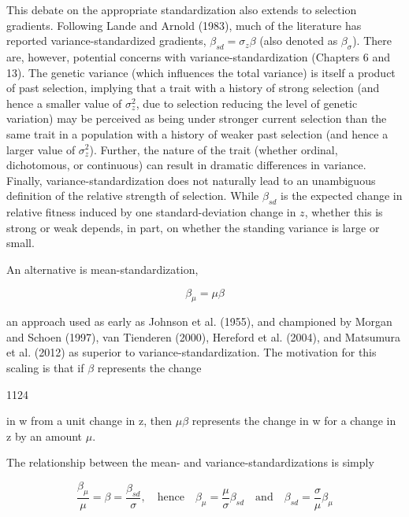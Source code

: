 \documentclass{article}
\begin{document}
This debate on the appropriate standardization also extends to selection gradients. Following Lande and Arnold (1983), much of the literature has reported variance-standardized gradients,  $ \beta_{sd} = \sigma_z \beta $ (also denoted as  $ \beta_\sigma $). There are, however, potential concerns with variance-standardization (Chapters 6 and 13). The genetic variance (which influences the total variance) is itself a product of past selection, implying that a trait with a history of strong selection (and hence a smaller value of  $ \sigma_z^2 $, due to selection reducing the level of genetic variation) may be perceived as being under stronger current selection than the same trait in a population with a history of weaker past selection (and hence a larger value of  $ \sigma_z^2 $). Further, the nature of the trait (whether ordinal, dichotomous, or continuous) can result in dramatic differences in variance. Finally, variance-standardization does not naturally lead to an unambiguous definition of the relative strength of selection. While  $ \beta_{sd} $ is the expected change in relative fitness induced by one standard-deviation change in  $ z $, whether this is strong or weak depends, in part, on whether the standing variance is large or small.

An alternative is mean-standardization,

\begin{equation}
\beta_{\mu}=\mu\beta
\tag{29.33a}
\label{eq:29_33a}
\end{equation}

an approach used as early as Johnson et al. (1955), and championed by Morgan and Schoen (1997), van Tienderen (2000), Hereford et al. (2004), and Matsumura et al. (2012) as superior to variance-standardization. The motivation for this scaling is that if  $ \beta $ represents the change

1124

in w from a unit change in z, then  $ \mu\beta $ represents the change in w for a change in z by an amount  $ \mu $.

The relationship between the mean- and variance-standardizations is simply

\begin{equation}
\frac{\beta_{\mu}}{\mu}=\beta=\frac{\beta_{sd}}{\sigma},\quad\mathrm{hence}\quad\beta_{\mu}=\frac{\mu}{\sigma}\beta_{sd}\quad\mathrm{and}\quad\beta_{sd}=\frac{\sigma}{\mu}\beta_{\mu}
\tag{29.33b}
\label{eq:29_33b}
\end{equation}
\end{document}
